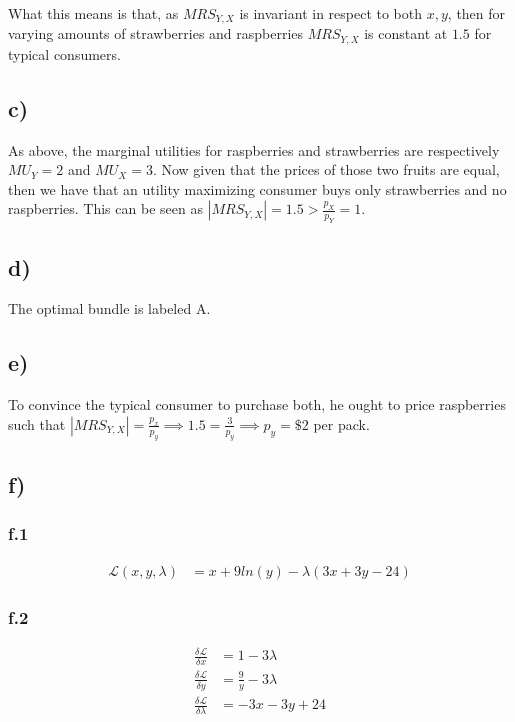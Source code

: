 \documentclass[12pt,letterpaper]{article}
\theoremstyle{definition}
\newcommand{\Lag}{\mathcal{L}}
\begin{document}
What this means is that, as $MRS_{Y,X}$ is invariant in respect to both $x, y$, then for varying amounts of strawberries and raspberries $MRS_{Y,X}$ is constant at $1.5$ for typical consumers.

\subsection*{c)}

As above, the marginal utilities for raspberries and strawberries are respectively 
$MU_Y=2$ and $MU_X = 3$. 
Now given that the prices of those two fruits are equal, 
then we have that an utility maximizing consumer buys only strawberries 
and no raspberries. This can be seen as $|MRS_{Y,X}| = 1.5 > \frac{p_X}{p_Y} = 1$.

\subsection*{d)}

The optimal bundle is labeled A.

\subsection*{e)}

To convince the typical consumer to purchase both, he ought to price raspberries 
such that $|MRS_{Y,X}| = \frac{p_x}{p_y} \implies 1.5 = \frac{3}{p_y} \implies p_y=\$2$ per pack.

\subsection*{f)}
\subsubsection*{f.1}
\begin{align*}
    \Lag (x, y, \lambda) &= x + 9ln(y) - \lambda(3x + 3y -24)
\end{align*}

\subsubsection*{f.2}
\begin{align*}
    \frac{\delta \Lag}{\delta x} &= 1 - 3\lambda\\
    \frac{\delta \Lag}{\delta y} &= \frac{9}{y} - 3\lambda \\
    \frac{\delta \Lag}{\delta \lambda} &= -3x - 3y + 24\\
\end{align*}
\end{document}
